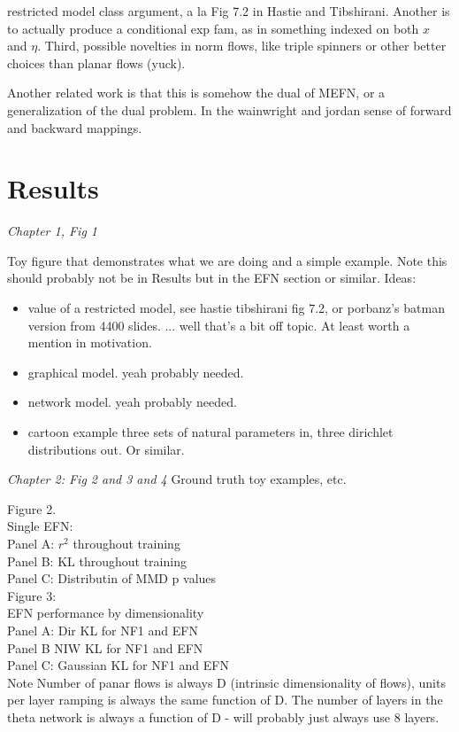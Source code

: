 \documentclass{article}
\begin{document}
restricted model class argument, a la Fig 7.2 in Hastie and Tibshirani.  Another is to actually produce a conditional exp fam, as in something indexed on both $x$ and $\eta$.  Third, possible novelties in norm flows, like triple spinners or other better choices than planar flows (yuck).

Another related work is that this is somehow the dual of MEFN, or a generalization of the dual problem.  In the wainwright and jordan sense of forward and backward mappings.
  
  
  \section{Results}

\emph{Chapter 1, Fig 1}
 
Toy figure that demonstrates what we are doing and a simple example.  Note this should probably not be in Results but in the EFN section or similar.  Ideas:
\begin{itemize}
\item value of a restricted model, see hastie tibshirani fig 7.2, or porbanz's batman version from 4400 slides.  ... well that's a bit off topic.  At least worth a mention in motivation.
\item graphical model.  yeah probably needed.
\item network model.  yeah probably needed.
\item cartoon example three sets of natural parameters in, three dirichlet distributions out.  Or similar.
\end{itemize}


 \emph{Chapter 2: Fig 2 and 3 and 4}
 Ground truth toy examples, etc. 
 
Figure 2. \\
Single EFN: \\
Panel A:  $r^2$ throughout training \\
Panel B: KL throughout training \\ 
Panel C: Distributin of MMD p values \\


Figure 3: \\
EFN performance by dimensionality \\
Panel A: Dir KL for NF1 and EFN \\
Panel B NIW KL for NF1 and EFN \\
Panel C: Gaussian KL for NF1 and EFN \\

Note Number of panar flows is always D (intrinsic dimensionality of flows), units per layer ramping is always the same function of D.  The number of layers in the theta network is always a function of D - will probably just always use 8 layers. \\
\end{document}
